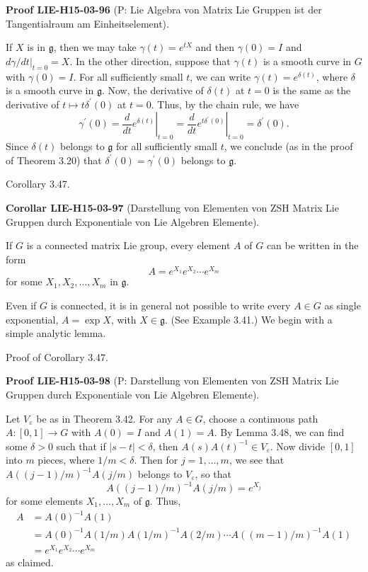 \documentclass[10pt, letterpaper]{article}
\newcommand{\CustomHeading}[3]{%
  \par\medskip\noindent%
  \textbf{#1 #2} \textnormal{(#3)}.\enskip%
}
\newenvironment{KORO}[2]{\begin{unitbox}\CustomHeading{Corollar}{#1}{#2}}{\end{unitbox}}
\newenvironment{PROOF}[2]{\begin{unitbox}\CustomHeading{Proof}{#1}{#2}}{\end{unitbox}}
\begin{document}
\begin{PROOF}{LIE-H15-03-96}{P: Lie Algebra von Matrix Lie Gruppen ist der Tangentialraum am Einheitselement}
If $X$ is in $\mathfrak{g}$, then we may take $\gamma(t)=e^{t X}$ and then $\gamma(0)=I$ and $d \gamma /\left.d t\right|_{t=0}=X$. In the other direction, suppose that $\gamma(t)$ is a smooth curve in $G$ with $\gamma(0)=I$. For all sufficiently small $t$, we can write $\gamma(t)=e^{\delta(t)}$, where $\delta$ is a smooth curve in $\mathfrak{g}$. Now, the derivative of $\delta(t)$ at $t=0$ is the same as the derivative of $t \mapsto t \delta^{\prime}(0)$ at $t=0$. Thus, by the chain rule, we have
$$
\gamma^{\prime}(0)=\left.\frac{d}{d t} e^{\delta(t)}\right|_{t=0}=\left.\frac{d}{d t} e^{t \delta^{\prime}(0)}\right|_{t=0}=\delta^{\prime}(0) .
$$
Since $\delta(t)$ belongs to $\mathfrak{g}$ for all sufficiently small $t$, we conclude (as in the proof of Theorem 3.20) that $\delta^{\prime}(0)=\gamma^{\prime}(0)$ belongs to $\mathfrak{g}$.
\end{PROOF}

Corollary 3.47. 

\begin{KORO}{LIE-H15-03-97}{Darstellung von Elementen von ZSH Matrix Lie Gruppen durch Exponentiale von Lie Algebren Elemente}
If $G$ is a connected matrix Lie group, every element $A$ of $G$ can be written in the form
$$
A=e^{X_{1}} e^{X_{2}} \cdots e^{X_{m}}
$$
for some $X_{1}, X_{2}, \ldots, X_{m}$ in $\mathfrak{g}$.
\end{KORO}

Even if $G$ is connected, it is in general not possible to write every $A \in G$ as single exponential, $A=\exp X$, with $X \in \mathfrak{g}$. (See Example 3.41.) We begin with a simple analytic lemma.



Proof of Corollary 3.47. 

\begin{PROOF}{LIE-H15-03-98}{P: Darstellung von Elementen von ZSH Matrix Lie Gruppen durch Exponentiale von Lie Algebren Elemente}
Let $V_{\varepsilon}$ be as in Theorem 3.42. For any $A \in G$, choose a continuous path $A:[0,1] \rightarrow G$ with $A(0)=I$ and $A(1)=A$. By Lemma 3.48, we can find some $\delta>0$ such that if $|s-t|<\delta$, then $A(s) A(t)^{-1} \in V_{\varepsilon}$. Now divide $[0,1]$ into $m$ pieces, where $1 / m<\delta$. Then for $j=1, \ldots, m$, we see that $A((j-1) / m)^{-1} A(j / m)$ belongs to $V_{\varepsilon}$, so that
$$
A((j-1) / m)^{-1} A(j / m)=e^{X_{j}}
$$
for some elements $X_{1}, \ldots, X_{m}$ of $\mathfrak{g}$. Thus,
$$
\begin{aligned}
A & =A(0)^{-1} A(1) \\
& =A(0)^{-1} A(1 / m) A(1 / m)^{-1} A(2 / m) \cdots A((m-1) / m)^{-1} A(1) \\
& =e^{X_{1}} e^{X_{2}} \cdots e^{X_{m}}
\end{aligned}
$$
as claimed.
\end{PROOF}
\end{document}
